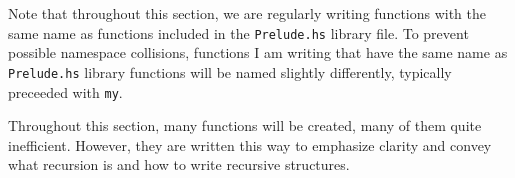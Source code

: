 \begin{remark*}
  Note that throughout this section, we are regularly writing functions with the same name as functions included in the \texttt{Prelude.hs} library file.
  To prevent possible namespace collisions, functions I am writing that have the same name as \texttt{Prelude.hs} library functions will be named slightly differently, typically preceeded with \texttt{my}.
\end{remark*}

\begin{remark*}
  Throughout this section, many  functions will be created, many of them quite inefficient.
  However, they are written this way to emphasize clarity and convey what recursion is and how to write recursive structures.
\end{remark*}












